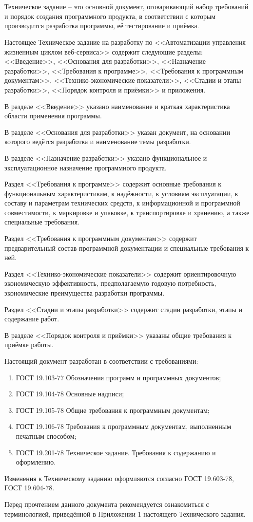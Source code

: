 \section*{}

Техническое задание -- это основной документ, оговаривающий набор требований и порядок создания программного продукта,
в соответствии с которым производится разработка программы, её тестирование и приёмка.

Настоящее Техническое задание на разработку по <<Автоматизации управления жизненным циклом веб-сервиса>> содержит следующие разделы:
<<Введение>>, <<Основания для разработки>>, <<Назначение разработки>>, <<Требования к программе>>, <<Требования к программным документам>>,
<<Технико-экономические показатели>>, <<Стадии и этапы разработки>>, <<Порядок контроля и приёмки>> и приложения.

В разделе <<Введение>> указано наименование и краткая характеристика области применения программы.

В разделе <<Основания для разработки>> указан документ, на основании которого ведётся разработка и наименование темы разработки.

В разделе <<Назначение разработки>> указано функциональное и эксплуатационное назначение программного продукта.

Раздел <<Требования к программе>> содержит основные требования к функциональным характеристикам, к надёжности, к условиям
эксплуатации, к составу и параметрам технических средств, к информационной и программной совместимости, к маркировке и
упаковке, к транспортировке и хранению, а также специальные требования.

Раздел <<Требования к программным документам>> содержит предварительный состав программной документации и специальные требования к ней.

Раздел <<Технико-экономические показатели>> содержит ориентировочную экономическую эффективность,
предполагаемую годовую потребность, экономические преимущества разработки программы.

Раздел <<Стадии и этапы разработки>> содержит стадии разработки, этапы и содержание работ.

В разделе <<Порядок контроля и приёмки>> указаны общие требования к приёмке работы.

Настоящий документ разработан в соответствии с требованиями:
\begin{enumerate}
    \item ГОСТ 19.103-77 Обозначения программ и программных документов;
    \item ГОСТ 19.104-78 Основные надписи;
    \item ГОСТ 19.105-78 Общие требования к программным документам;
    \item ГОСТ 19.106-78 Требования к программным документам, выполненным печатным способом;
    \item ГОСТ 19.201-78 Техническое задание.
    Требования к содержанию и оформлению.
\end{enumerate}

Изменения к Техническому заданию оформляются согласно ГОСТ 19.603-78, ГОСТ 19.604-78.

Перед прочтением данного документа рекомендуется ознакомиться с терминологией, приведённой в Приложении 1 настоящего
Технического задания.